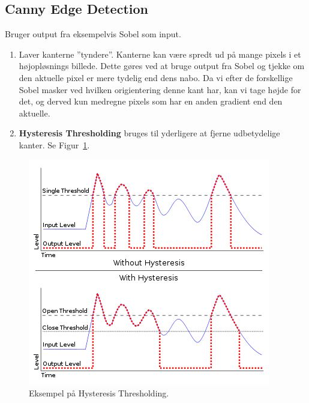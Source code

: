 \subsection{Canny Edge Detection}

Bruger output fra eksempelvis Sobel som input.

\begin{enumerate}
	\item Laver kanterne ''tyndere''. Kanterne kan være spredt ud på mange pixels i et højopløsnings billede. Dette gøres ved at bruge output fra Sobel og tjekke om den aktuelle pixel er mere tydelig end dens nabo. Da vi efter de forskellige Sobel masker ved hvilken origientering denne kant har, kan vi tage højde for det, og derved kun medregne pixels som har en anden gradient end den aktuelle.
	\item \textbf{Hysteresis Thresholding} bruges til yderligere at fjerne udbetydelige kanter. Se Figur~\ref{fig:hysteresis-thresholding}.
\end{enumerate}

\begin{figure}[H]
	\centering
	\includegraphics[width=0.7\linewidth]{figs/spm11/hysteresis-thresholding}
	\caption{Eksempel på Hysteresis Thresholding.}
	\label{fig:hysteresis-thresholding}
\end{figure}
